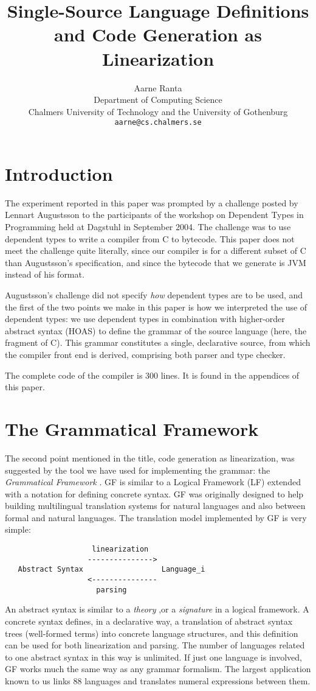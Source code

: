 \documentclass[12pt]{article}
\title{{\bf Single-Source Language Definitions and Code Generation as Linearization}}
\author{Aarne Ranta \\
  Department of Computing Science \\
  Chalmers University of Technology and the University of Gothenburg\\
  {\tt aarne@cs.chalmers.se}}
\newcommand{\empha}[1]{{\em #1}}
\begin{document}
\maketitle


\section{Introduction}

The experiment reported in this paper was prompted by a challenge
posted by Lennart Augustsson to the participants of the workshop
on Dependent Types in Programming held at Dagstuhl in September 2004.
The challenge was to use dependent types to write a compiler from
C to bytecode. This paper does not meet the challenge quite literally,
since our compiler is for a different subset of C than Augustsson's
specification, and since the bytecode that we generate is JVM instead
of his format. 

Augustsson's  challenge did not specify \textit{how} dependent
types are to be used, and the first of the two points we make in this
paper is how we interpreted the use of dependent types:
we use dependent types in combination with higher-order abstract syntax (HOAS)
to define the grammar of the source language (here, the fragment of C).
This grammar constitutes a single, declarative source, from which
the compiler front end is derived, comprising both parser and type
checker.

The complete code of the compiler is 300 lines. It is found in 
the appendices of this paper.


\section{The Grammatical Framework}

The second point mentioned in the title, 
code generation as linearization, was suggested by
the tool we have used for implementing the grammar:
the \empha{Grammatical Framework} \cite{gf-jfp}. GF 
is similar to a Logical Framework (LF) extended with
a notation for defining concrete syntax. GF was originally
designed to help building multilingual
translation systems for natural languages and also
between formal and natural languages. The translation model
implemented by GF is very simple:
\begin{verbatim}
                    linearization
                   --------------->
   Abstract Syntax                  Language_i
                   <---------------
                     parsing
\end{verbatim}
An abstract syntax is similar to a \empha{theory} ,or a
\empha{signature} in a logical framework. A 
concrete syntax defines, in a declarative way,
a translation of abstract syntax trees (well-formed terms) 
into concrete language structures, and this definition can
be used for both linearization and parsing.
The number of languages related to one abstract syntax in
this way is unlimited. If just one language is involved, GF
works much the same way as any grammar formalism. The largest
application known to us links 88 languages and translates
numeral expressions between them.
 
\end{document}
